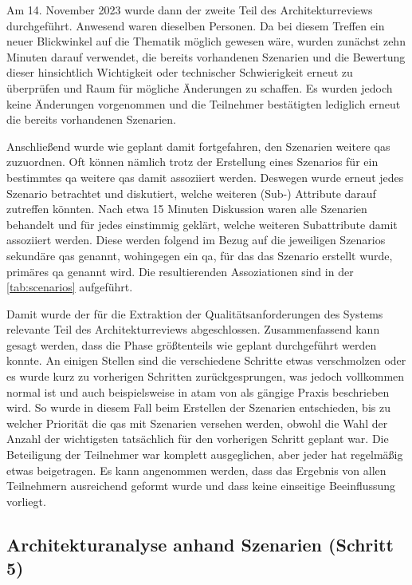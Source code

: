 Am 14. November 2023 wurde dann der zweite Teil des Architekturreviews durchgeführt.
Anwesend waren dieselben Personen.
Da bei diesem Treffen ein neuer Blickwinkel auf die Thematik möglich gewesen wäre, wurden zunächst zehn Minuten darauf verwendet, die bereits vorhandenen Szenarien und die Bewertung dieser hinsichtlich Wichtigkeit oder technischer Schwierigkeit erneut zu überprüfen und Raum für mögliche Änderungen zu schaffen.
Es wurden jedoch keine Änderungen vorgenommen und die Teilnehmer bestätigten lediglich erneut die bereits vorhandenen Szenarien.

Anschließend wurde wie geplant damit fortgefahren, den Szenarien weitere \glspl{qa} zuzuordnen.
Oft können nämlich trotz der Erstellung eines Szenarios für ein bestimmtes \gls{qa} weitere \glspl{qa} damit assoziiert werden.
Deswegen wurde erneut jedes Szenario betrachtet und diskutiert, welche weiteren (Sub-) Attribute darauf zutreffen könnten.
Nach etwa 15 Minuten Diskussion waren alle Szenarien behandelt und für jedes einstimmig geklärt, welche weiteren Subattribute damit assoziiert werden.
Diese werden folgend im Bezug auf die jeweiligen Szenarios sekundäre \glspl{qa} genannt, wohingegen ein \gls{qa}, für das das Szenario erstellt wurde, primäres \gls{qa} genannt wird.
Die resultierenden Assoziationen sind in der \cref{tab:scenarios} aufgeführt.



Damit wurde der für die Extraktion der Qualitätsanforderungen des Systems relevante Teil des Architekturreviews abgeschlossen.
Zusammenfassend kann gesagt werden, dass die Phase größtenteils wie geplant durchgeführt werden konnte.
An einigen Stellen sind die verschiedene Schritte etwas verschmolzen oder es wurde kurz zu vorherigen Schritten zurückgesprungen, was jedoch vollkommen normal ist und auch beispielsweise in \gls{atam} von  als gängige Praxis beschrieben wird.
So wurde in diesem Fall beim Erstellen der Szenarien entschieden, bis zu welcher Priorität die \glspl{qa} mit Szenarien versehen werden, obwohl die Wahl der Anzahl der wichtigsten tatsächlich für den vorherigen Schritt geplant war.
Die Beteiligung der Teilnehmer war komplett ausgeglichen, aber jeder hat regelmäßig etwas beigetragen.
Es kann angenommen werden, dass das Ergebnis von allen Teilnehmern ausreichend geformt wurde und dass keine einseitige Beeinflussung vorliegt.

\subsection{Architekturanalyse anhand Szenarien (Schritt 5)}


